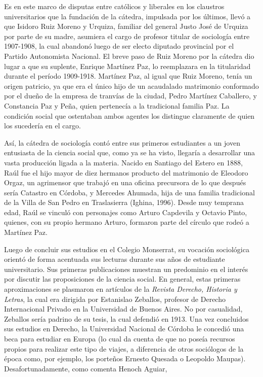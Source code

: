 Es en este marco de disputas entre católicos y liberales en los claustros universitarios que la fundación de la cátedra, impulsada por los últimos, llevó a que Isidoro Ruiz Moreno y Urquiza, familiar del general Justo José de Urquiza por parte de su madre, asumiera el cargo de profesor titular de sociología entre 1907-1908, la cual abandonó luego de ser electo diputado provincial por el Partido Autonomista Nacional. El breve paso de Ruiz Moreno por la cátedra dio lugar a que su suplente, Enrique Martínez Paz, lo reemplazara en la titularidad durante el período 1909-1918. Martínez Paz, al igual que Ruiz Moreno, tenía un origen patricio, ya que era el único hijo de un acaudalado matrimonio conformado por el dueño de la empresa de tranvías de la ciudad, Pedro Martínez Caballero, y Constancia Paz y Peña, quien pertenecía a la tradicional familia Paz. La condición social que ostentaban ambos agentes los distingue claramente de quien los sucedería en el cargo.

Así, la cátedra de sociología contó entre sus primeros estudiantes a un joven entusiasta de la ciencia social que, como ya se ha visto, llegaría a desarrollar una vasta producción ligada a la materia. Nacido en Santiago del Estero en 1888, Raúl fue el hijo mayor de diez hermanos producto del matrimonio de Eleodoro Orgaz, un agrimensor que trabajó en una oficina precursora de lo que después sería Catastro en Córdoba, y Mercedes Ahumada, hija de una familia tradicional de la Villa de San Pedro en Traslasierra (Ighina, 1996). Desde muy temprana edad, Raúl se vinculó con personajes como Arturo Capdevila y Octavio Pinto, quienes, con su propio hermano Arturo, formaron parte del círculo que rodeó a Martínez Paz.

Luego de concluir sus estudios en el Colegio Monserrat, su vocación sociológica orientó de forma acentuada sus lecturas durante sus años de estudiante universitario. Sus primeras publicaciones muestran un predominio en el interés por discutir las proposiciones de la ciencia social. En general, estas primeras aproximaciones se plasmaron en artículos de la \emph{Revista Derecho, Historia y Letras}, la cual era dirigida por Estanislao Zeballos, profesor de Derecho Internacional Privado en la Universidad de Buenos Aires. No por casualidad, Zeballos sería padrino de su tesis, la cual defendió en 1913. Una vez concluidos sus estudios en Derecho, la Universidad Nacional de Córdoba le concedió una beca para estudiar en Europa (lo cual da cuenta de que no poseía recursos propios para realizar este tipo de viajes, a diferencia de otros sociólogos de la época como, por ejemplo, los porteños Ernesto Quesada o Leopoldo Maupas). Desafortunadamente, como comenta Henoch Aguiar,

